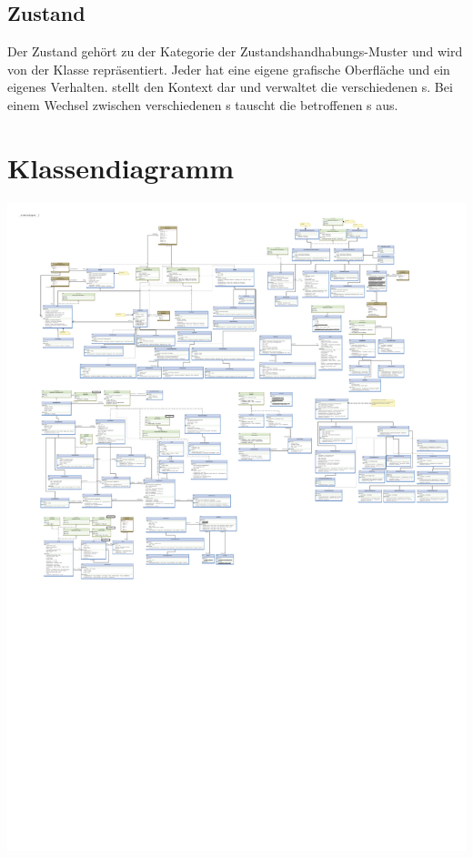 \subsection{Zustand}
Der Zustand gehört zu der Kategorie der Zustandshandhabungs-Muster und wird von der Klasse  repräsentiert. Jeder  hat eine eigene grafische Oberfläche und ein eigenes Verhalten.
 stellt den Kontext dar und verwaltet die verschiedenen s. Bei einem Wechsel zwischen verschiedenen s tauscht  die betroffenen s aus.

\section{Klassendiagramm}

\includegraphics[scale=0.8, trim=0mm 10mm 0mm 0mm]{Klassendiagramm.pdf}